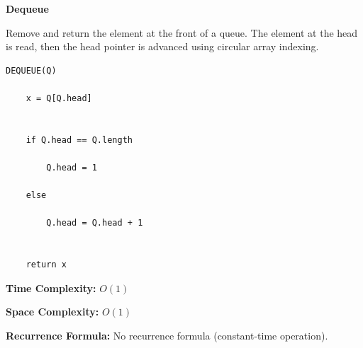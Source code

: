 \documentclass[a4paper,12pt]{article}
\begin{document}
\begin{tcolorbox}[
    colback=gray!30,
    colframe=black,
    boxrule=1pt,
    arc=0mm
]

\begin{tcolorbox}[
    colback=gray!10,
    colframe=black,
    arc=0mm
]
\centering
{\Huge\bfseries Dequeue}
\end{tcolorbox}


\begin{tcolorbox}[
    colback=gray!10,
    colframe=black,
    arc=0mm
]
\small
Remove and return the element at the front of a queue.
The element at the head is read, then the head pointer is advanced
using circular array indexing.
\end{tcolorbox}


\begin{tcolorbox}[
    colback=black!5,
    colframe=black,
    arc=0mm,
    title=Pseudo-code
]
\tiny
\begin{lstlisting}
DEQUEUE(Q)

    x = Q[Q.head]


    if Q.head == Q.length

        Q.head = 1

    else

        Q.head = Q.head + 1


    return x
\end{lstlisting}
\end{tcolorbox}


\begin{tcolorbox}[
    colback=cyan!20,
    colframe=black,
    arc=0mm
]
\small
\textbf{Time Complexity:}
$O(1)$
\end{tcolorbox}


\begin{tcolorbox}[
    colback=violet!20,
    colframe=black,
    arc=0mm
]
\small
\textbf{Space Complexity:}
$O(1)$
\end{tcolorbox}


\begin{tcolorbox}[
    colback=pink!20,
    colframe=black,
    arc=0mm
]
\small
\textbf{Recurrence Formula:}
No recurrence formula (constant-time operation).
\end{tcolorbox}

\end{tcolorbox}
\end{document}
